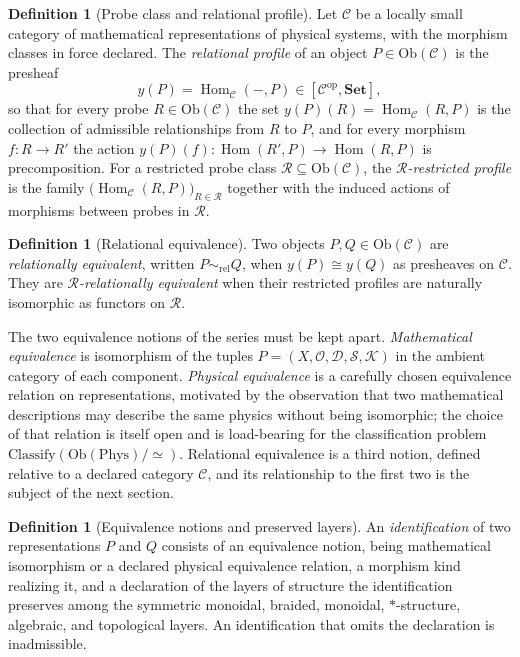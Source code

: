 \documentclass[11pt,letterpaper]{article}
\DeclareMathOperator{\Hom}{Hom}
\theoremstyle{definition}
\newtheorem{definition}[theorem]{Definition}
\theoremstyle{remark}
\begin{document}
\begin{definition}[Probe class and relational profile]
\label{def:profile}
Let $\mathcal{C}$ be a locally small category of mathematical representations of physical systems, with the morphism classes in force declared. The \emph{relational profile} of an object $P \in \mathrm{Ob}(\mathcal{C})$ is the presheaf
\[
y(P) = \Hom_{\mathcal{C}}(-, P) \in [\mathcal{C}^{\mathrm{op}}, \mathbf{Set}],
\]
so that for every probe $R \in \mathrm{Ob}(\mathcal{C})$ the set $y(P)(R) = \Hom_{\mathcal{C}}(R, P)$ is the collection of admissible relationships from $R$ to $P$, and for every morphism $f \colon R \to R'$ the action $y(P)(f) \colon \Hom(R', P) \to \Hom(R, P)$ is precomposition. For a restricted probe class $\mathcal{R} \subseteq \mathrm{Ob}(\mathcal{C})$, the \emph{$\mathcal{R}$-restricted profile} is the family $\big(\Hom_{\mathcal{C}}(R, P)\big)_{R \in \mathcal{R}}$ together with the induced actions of morphisms between probes in $\mathcal{R}$.
\end{definition}

\begin{definition}[Relational equivalence]
\label{def:releq}
Two objects $P, Q \in \mathrm{Ob}(\mathcal{C})$ are \emph{relationally equivalent}, written $P \sim_{\mathrm{rel}} Q$, when $y(P) \cong y(Q)$ as presheaves on $\mathcal{C}$. They are \emph{$\mathcal{R}$-relationally equivalent} when their restricted profiles are naturally isomorphic as functors on $\mathcal{R}$.
\end{definition}

The two equivalence notions of the series must be kept apart. \emph{Mathematical equivalence} is isomorphism of the tuples $P = (X, \mathcal{O}, \mathcal{D}, \mathcal{S}, \mathcal{K})$ in the ambient category of each component. \emph{Physical equivalence} is a carefully chosen equivalence relation on representations, motivated by the observation that two mathematical descriptions may describe the same physics without being isomorphic; the choice of that relation is itself open and is load-bearing for the classification problem $\mathrm{Classify}(\mathrm{Ob}(\mathrm{Phys})/{\simeq})$. Relational equivalence is a third notion, defined relative to a declared category $\mathcal{C}$, and its relationship to the first two is the subject of the next section.

\begin{definition}[Equivalence notions and preserved layers]
\label{def:equiv}
An \emph{identification} of two representations $P$ and $Q$ consists of an equivalence notion, being mathematical isomorphism or a declared physical equivalence relation, a morphism kind realizing it, and a declaration of the layers of structure the identification preserves among the symmetric monoidal, braided, monoidal, $*$-structure, algebraic, and topological layers. An identification that omits the declaration is inadmissible.
\end{definition}
\end{document}
